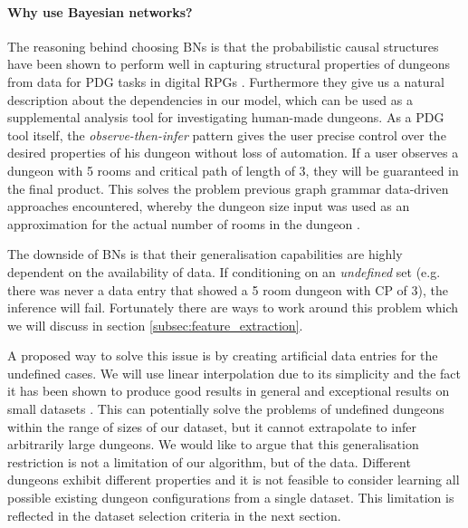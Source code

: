 \documentclass{UoYCSproject}
\begin{document}
\paragraph{Why use Bayesian networks?}
The reasoning behind choosing BNs is that the probabilistic causal structures have been shown to perform well in capturing structural properties of dungeons from data for PDG tasks in digital RPGs \parencite{SummervilleLearningOfZelda,SummervilleSamplingHyrule}. Furthermore they give us a natural description about the dependencies in our model, which can be used as a supplemental analysis tool for investigating human-made dungeons. As a PDG tool itself, the \textit{observe-then-infer} pattern gives the user precise control over the desired properties of his dungeon without loss of automation. If a user observes a dungeon with 5 rooms and critical path of length of 3, they will be guaranteed in the final product. This solves the problem previous graph grammar data-driven approaches encountered, whereby the dungeon size input was used as an approximation for the actual number of rooms in the dungeon \parencite{Deery}.

The downside of BNs is that their generalisation capabilities are highly dependent on the availability of data. If conditioning on an \textit{undefined} set (e.g. there was never a data entry that showed a 5 room dungeon with CP of 3), the inference will fail. Fortunately there are ways to work around this problem which we will discuss in section \ref{subsec:feature_extraction}.

A proposed way to solve this issue is by creating artificial data entries for the undefined cases. We will use linear interpolation due to its simplicity and the fact it has been shown to produce good results in general \parencite{Ibargengoytia2013OnTE} and exceptional results on small datasets \parencite{yu2004advances}. This can potentially solve the problems of undefined dungeons within the range of sizes of our dataset, but it cannot extrapolate to infer arbitrarily large dungeons. We would like to argue that this generalisation restriction is not a limitation of our algorithm, but of the data. Different dungeons exhibit different properties and it is not feasible to consider learning all possible existing dungeon configurations from a single dataset. This limitation is reflected in the dataset selection criteria in the next section.
\end{document}
